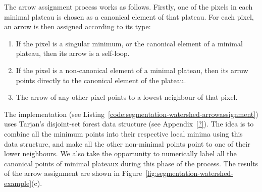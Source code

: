 The arrow assignment process works as follows. Firstly, one of the pixels in each minimal plateau is chosen as a canonical element of that plateau. For each pixel, an arrow is then assigned according to its type:
%
\begin{enumerate}
\item If the pixel is a singular minimum, or the canonical element of a minimal plateau, then its arrow is a self-loop.
\item If the pixel is a non-canonical element of a minimal plateau, then its arrow points directly to the canonical element of the plateau.
\item The arrow of any other pixel points to a lowest neighbour of that pixel.
\end{enumerate}

The implementation (see Listing~\ref{code:segmentation-watershed-arrowassignment}) uses Tarjan's disjoint-set forest data structure (see Appendix~\ref{?}). The idea is to combine all the minimum points into their respective local minima using this data structure, and make all the other non-minimal points point to one of their lower neighbours. We also take the opportunity to numerically label all the canonical points of minimal plateaux during this phase of the process. The results of the arrow assignment are shown in Figure~\ref{fig:segmentation-watershed-example}(c).


